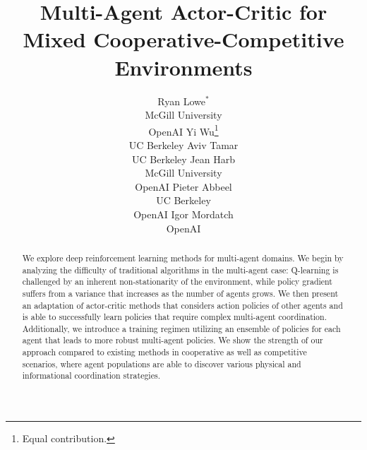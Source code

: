 \documentclass{article}
\title{Multi-Agent Actor-Critic for Mixed Cooperative-Competitive Environments} %
\author{Ryan Lowe$^*$\\ McGill University\\ OpenAI \And \hspace{-4mm}Yi Wu\thanks{Equal contribution.}\\ \hspace{-4mm}UC Berkeley \And Aviv Tamar\\ UC Berkeley \AND Jean Harb\\McGill University\\ OpenAI \And Pieter Abbeel\\UC Berkeley\\ OpenAI \And Igor Mordatch\\ OpenAI
}
\begin{document}

\maketitle

\begin{abstract}
We explore deep reinforcement learning methods for multi-agent domains. We begin by analyzing the difficulty of traditional algorithms in the multi-agent case: Q-learning is challenged by an inherent non-stationarity of the environment, while policy gradient suffers from a variance that increases as the number of agents grows. 
We then present an adaptation of actor-critic methods that considers action policies of other agents and is able to successfully learn policies that require complex multi-agent coordination. Additionally, we introduce a training regimen utilizing an ensemble of policies for each agent that leads to more robust multi-agent policies. We show the strength of our approach compared to existing methods in cooperative as well as competitive scenarios, where agent populations are able to discover various physical and informational coordination strategies.%



\end{abstract}
\end{document}
